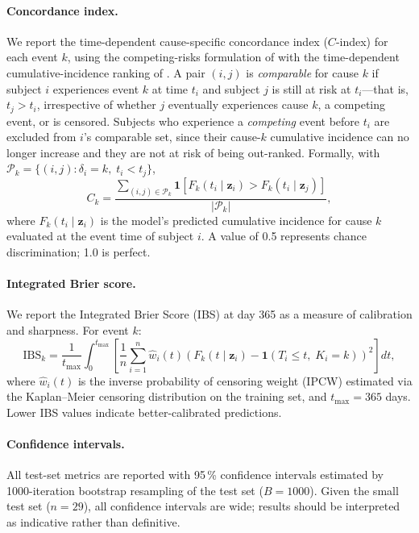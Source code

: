 \documentclass[11pt,a4paper]{article}
\begin{document}
\paragraph{Concordance index.}
We report the time-dependent cause-specific concordance index ($C$-index) for
each event $k$, using the competing-risks formulation of
\citet{wolbers2009concordance} with the time-dependent cumulative-incidence
ranking of \citet{antolini2005tdauc}.  A pair $(i,j)$ is \emph{comparable} for
cause $k$ if subject $i$ experiences event $k$ at time $t_i$ and subject $j$ is
still at risk at $t_i$---that is, $t_j > t_i$, irrespective of whether $j$
eventually experiences cause $k$, a competing event, or is censored.  Subjects
who experience a \emph{competing} event before $t_i$ are excluded from $i$'s
comparable set, since their cause-$k$ cumulative incidence can no longer
increase and they are not at risk of being out-ranked.  Formally, with
$\mathcal{P}_k = \{(i,j) : \delta_i = k,\; t_i < t_j\}$,
\begin{equation}
  C_k
    = \frac{
        \displaystyle\sum_{(i,j)\in\mathcal{P}_k}
          \mathbf{1}\!\left[F_k(t_i \mid \mathbf{z}_i)
                           > F_k(t_i \mid \mathbf{z}_j)\right]
      }{|\mathcal{P}_k|},
  \label{eq:cindex}
\end{equation}
where $F_k(t_i \mid \mathbf{z}_i)$ is the model's predicted cumulative
incidence for cause $k$ evaluated at the event time of subject $i$.  A value of
0.5 represents chance discrimination; 1.0 is perfect.

\paragraph{Integrated Brier score.}
We report the Integrated Brier Score (IBS) \citep{graf1999brier} at day 365
as a measure of calibration and sharpness.  For event $k$:
\begin{equation}
  \mathrm{IBS}_k
    = \frac{1}{t_{\max}}
      \int_0^{t_{\max}}
        \left[
          \frac{1}{n} \sum_{i=1}^n
          \hat{w}_i(t)
          \left(F_k(t \mid \mathbf{z}_i)
               - \mathbf{1}(T_i \leq t,\; K_i = k)\right)^2
        \right] dt,
  \label{eq:ibs}
\end{equation}
where $\hat{w}_i(t)$ is the inverse probability of censoring weight (IPCW)
estimated via the Kaplan--Meier censoring distribution on the training set,
and $t_{\max} = 365$ days.  Lower IBS values indicate better-calibrated
predictions.

\paragraph{Confidence intervals.}
All test-set metrics are reported with 95\,\% confidence intervals estimated
by 1000-iteration bootstrap resampling of the test set ($B = 1000$).  Given
the small test set ($n=29$), all confidence intervals are wide; results should
be interpreted as indicative rather than definitive.
\end{document}
